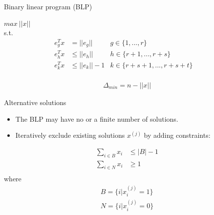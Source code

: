 \documentclass{beamer}
\begin{document}
\begin{frame}{Binary linear program (BLP)}
    
$max ~||x||$ \\
s.t. 
\begin{align*}
    e^{T}_{g} x & =       ||e_{g}||      & g \in \{1, ..., r\}     &~\\
    e^{T}_{h} x & \leq    ||e_{h}||     & h \in \{r+1, ..., r+s\} &~\\
    e^{T}_{k} x & \leq    ||e_{k}||-1  & k \in \{r+s+1, ..., r+s+t\} &~\\
\end{align*}


\begin{align*}
    \Delta_{min} = n - ||x||
\end{align*}

\end{frame}

\begin{frame}{Alternative solutions}
\begin{itemize}
    \item The BLP may have no or a finite number of solutions.
    \item Iteratively exclude existing solutions $x^{(j)}$ by adding constraints:
\end{itemize}
    
    \begin{align*}
        \sum_{i \in B} x_i & \leq |B| -1 \\
        \sum_{i \in N} x_i & \geq 1   \\
    \end{align*}
    where 
    \begin{align*}
        B = \{i |x_{i}^{(j)} = 1\} \\
        N = \{i |x_{i}^{(j)} = 0\} \\
    \end{align*}

\end{frame}


\end{document}
